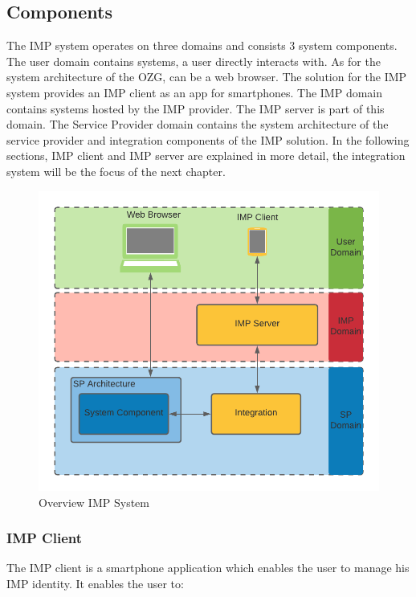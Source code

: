 \documentclass[
     12pt,         %
     a4paper,      %
     BCOR=10mm,version=first,     %
     DIV=14,version=first,        %
     ]{scrreprt}
\begin{document}
\subsection{Components}
The IMP system operates on three domains and consists 3 system components. The user domain contains systems, a user directly interacts with. As for the system architecture of the OZG, can be a web browser. The solution for the IMP system provides an IMP client as an app for smartphones. The IMP domain contains systems hosted by the IMP provider. The IMP server is part of this domain. The Service Provider domain contains the system architecture of the service provider and integration components of the IMP solution.
In the following sections, IMP client and IMP server are explained in more detail, the integration system will be the focus of the next chapter.

\begin{figure}[h]
\caption{Overview IMP System}
    \centering
    \includegraphics[scale=0.25]{Diagrams/IMP System Overview.png}
\end{figure}

\subsubsection{IMP Client}

The IMP client is a smartphone application which enables the user to manage his IMP identity. It enables the user to:
\end{document}
